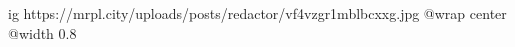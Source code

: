  
 
 
 
 

\ifcmt
  ig https://mrpl.city/uploads/posts/redactor/vf4vzgr1mblbcxxg.jpg
  @wrap center
  @width 0.8
\fi
